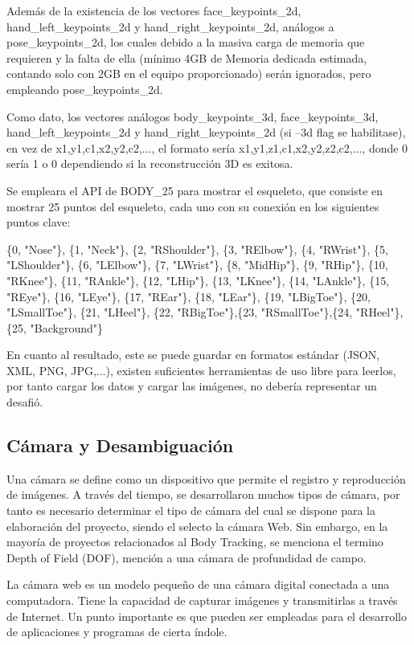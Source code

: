 Además de la existencia de los vectores face\_keypoints\_2d, hand\_left\_keypoints\_2d y hand\_right\_keypoints\_2d, análogos a pose\_keypoints\_2d, los cuales debido a la masiva carga de memoria que requieren y la falta de ella (mínimo 4GB de Memoria dedicada estimada, contando solo con 2GB en el equipo proporcionado) serán ignorados, pero empleando pose\_keypoints\_2d.

Como dato, los vectores análogos body\_keypoints\_3d, face\_keypoints\_3d,
hand\_left\_keypoints\_2d y hand\_right\_keypoints\_2d (si --3d flag se habilitase), en vez de 
x1,y1,c1,x2,y2,c2,..., el formato sería x1,y1,z1,c1,x2,y2,z2,c2,..., donde 0 sería 1 o 0 dependiendo si la reconstrucción 3D es exitosa.

Se empleara el API de BODY\_25 para mostrar el esqueleto, que consiste en mostrar 25 puntos del esqueleto, cada uno con su conexión en los siguientes puntos clave:

\{0,  "Nose"\}, \{1,  "Neck"\}, \{2,  "RShoulder"\}, \{3,  "RElbow"\}, \{4,  "RWrist"\}, 
\{5,  "LShoulder"\}, \{6,  "LElbow"\}, \{7,  "LWrist"\}, \{8,  "MidHip"\}, \{9,  "RHip"\},
\{10, "RKnee"\}, \{11, "RAnkle"\}, \{12, "LHip"\}, \{13, "LKnee"\}, \{14, "LAnkle"\}, 
\{15, "REye"\}, \{16, "LEye"\}, \{17, "REar"\}, \{18, "LEar"\}, \{19, "LBigToe"\},
\{20, "LSmallToe"\}, \{21, "LHeel"\}, \{22, "RBigToe"\},\{23, "RSmallToe"\},\{24, "RHeel"\},
\{25, "Background"\}


En cuanto al resultado, este se puede guardar en formatos estándar (JSON, XML, PNG, JPG,...), existen suficientes herramientas de uso libre para leerlos, por tanto cargar los datos y cargar las imágenes, no debería representar un desafió.

\subsection{Cámara y Desambiguación}

Una cámara se define como un dispositivo que permite el registro y reproducción de imágenes. A través del tiempo, se desarrollaron muchos tipos de cámara, por tanto es necesario determinar el tipo de cámara del cual se dispone para la elaboración del proyecto, siendo el selecto la cámara Web. Sin embargo, en la mayoría de proyectos relacionados al Body Tracking, se menciona el termino Depth of Field (DOF), mención a una cámara de profundidad de campo.

La cámara web es un modelo pequeño de una cámara digital conectada a una computadora. Tiene la capacidad de capturar imágenes y transmitirlas a través de Internet. Un punto importante es que pueden ser empleadas para el desarrollo de aplicaciones y programas de cierta índole. 

